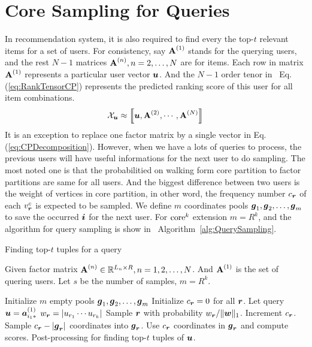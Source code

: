 \documentclass[letterpaper]{article}
\newcommand{\T}[1]{\mathcal{#1}}
\newcommand{\KT}[1]{\left\llbracket #1 \right\rrbracket}
\newcommand{\V}[1]{{\boldsymbol{{\MakeLowercase{#1}}}}}
\newcommand{\VnC}[3]{\V{#1}^{(#2)}_{#3}}
\newcommand{\M}[1]{{\textbf{{\MakeUppercase{#1}}}}}
\newcommand{\Mn}[2]{\M{#1}^{(#2)}}
\newcommand{\norm}[2]{\|#1\|_{#2}}
\newcommand{\Eqn}[1]   {Eq.(\ref{eq:#1})}
\newcommand{\Alg}[1] {Algorithm~\ref{alg:#1}}
\begin{document}
\section{Core Sampling for Queries}
In recommendation system,
it is also required to find every the top-$t$ relevant items for a set of users.
For consistency,
say $\M{A}^{(1)}$ stands for the querying users,
and the rest $N-1$ matrices $\M{A}^{(n)},n=2,\ldots,N$ are for items.
Each row in matrix $\M{A}^{(1)}$ represents a particular user vector $\V{u}$.
And the $N-1$ order tenor in ~\Eqn{RankTensorCP}
represents the predicted ranking score of this user for all item combinations.
\begin{equation}\label{eq:RankTensorCP}
\T{X}_{\V{u}} \approx \KT{\V{u},\Mn{A}{2},\cdots,\Mn{A}{N}} 
\end{equation}
It is an exception to replace one factor matrix by a single vector in \Eqn{CPDecomposition}.
However, when we have a lots of queries to process,
the previous users will have useful informations for the next user to do sampling.
The most noted one is that
the probabilitied on walking form core partition to factor partitions are same for all users.
And the biggest difference between two users is the weight of vertices in core partition,
in other word,
the frequency number $c_{\V{r}}$ of each $v^c_{\V{r}}$ is expected to be sampled.
We define $m$ coordinates pools $\V{g}_1,\V{g}_2,\ldots,\V{g}_{m}$ to save the occurred $\V{i}$ for the next user.
For ${\rm core}^k$ extension $m = R^k$,
and the algorithm for query sampling is show in ~\Alg{QuerySampling}.

\begin{algorithm}[ht]
    \caption{Finding top-$t$ tuples for a query}
    \label{alg:QuerySampling}
        Given factor matrix $\M{A}^{(n)}\in \mathbb{R}^{L_n\times R}, n = 1,2,\ldots,N$.
        And $\M{A}^{(1)}$ is the set of quering users.
        Let $s$ be the number of samples, $m=R^k$.
    \begin{algorithmic}[1]
    \State Initialize $m$ empty pools $\V{g}_1,\V{g}_2,\ldots,\V{g}_m$
    \State Initialize $c_{\V{r}} = 0$ for all $\V{r}$.
    \State Let query $\V{u}=\VnC{a}{1}{i_1*}$
    \ForAll{$\V{r}$}
    \State $w_\V{r} = |u_{r_1}\cdots u_{r_k}|$
    \EndFor
    \State Sample $\V{r}$ with probability $w_\V{r}/\norm{\V{W}}{1}$.
    \label{line:Indexes}
    \State  Increment $c_{\V{r}}$.
    \EndFor
    \ForAll {$\V{r}$}
    \If {$c_\V{r} > |\V{g}_\V{r}|$ }
    \State Sample $c_{\V{r}} - |\V{g}_{\V{r}}|$ coordinates into $\V{g}_{\V{r}}$.
    \EndIf
    \State Use $c_{\V{r}}$ coordinates in $\V{g}_{\V{r}}$ and compute scores.
    \EndFor
    \State Post-processing for finding top-$t$ tuples of $\V{u}$.
    \EndFor
    \end{algorithmic}
\end{algorithm}
\end{document}
